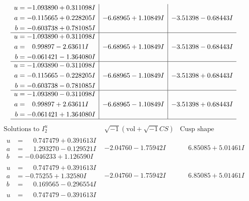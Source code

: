 \documentclass[1p]{elsarticle_modified}
\theoremstyle{definition}
\newcommand{\I}{\sqrt{-1}}
\begin{document}
$$\begin{array}{c|c|c}
\begin{aligned}
u &= -1.093890 + 0.311098 I \\
a &= -0.115665 + 0.228205 I \\
b &= -0.603738 + 0.781085 I\end{aligned}
 & -6.68965 + 1.10849 I & -3.51398 - 0.68443 I \\ \hline\begin{aligned}
u &= -1.093890 + 0.311098 I \\
a &= \phantom{-}0.99897 - 2.63611 I \\
b &= -0.061421 - 1.364080 I\end{aligned}
 & -6.68965 + 1.10849 I & -3.51398 - 0.68443 I \\ \hline\begin{aligned}
u &= -1.093890 - 0.311098 I \\
a &= -0.115665 - 0.228205 I \\
b &= -0.603738 - 0.781085 I\end{aligned}
 & -6.68965 - 1.10849 I & -3.51398 + 0.68443 I \\ \hline\begin{aligned}
u &= -1.093890 - 0.311098 I \\
a &= \phantom{-}0.99897 + 2.63611 I \\
b &= -0.061421 + 1.364080 I\end{aligned}
 & -6.68965 - 1.10849 I & -3.51398 + 0.68443 I\\
 \hline 
 \end{array}$$\newpage$$\begin{array}{c|c|c}  
\text{Solutions to }I^u_{2}& \I (\text{vol} + \sqrt{-1}CS) & \text{Cusp shape}\\
 \hline 
\begin{aligned}
u &= \phantom{-}0.747479 + 0.391613 I \\
a &= \phantom{-}1.293270 - 0.129521 I \\
b &= -0.046233 + 1.126590 I\end{aligned}
 & -2.04760 - 1.75942 I & \phantom{-}6.85085 + 5.01461 I \\ \hline\begin{aligned}
u &= \phantom{-}0.747479 + 0.391613 I \\
a &= -0.75255 + 1.32580 I \\
b &= \phantom{-}0.169565 - 0.296554 I\end{aligned}
 & -2.04760 - 1.75942 I & \phantom{-}6.85085 + 5.01461 I \\ \hline\begin{aligned}
u &= \phantom{-}0.747479 - 0.391613 I \\

\end{aligned}
\end{array}$$
\end{document}
